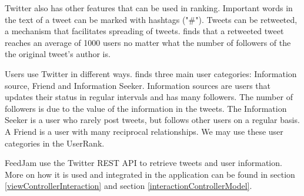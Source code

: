 
Twitter also has other features that can be used in ranking. Important words in the text of a tweet can be marked with hashtags ("\#"). Tweets can be retweeted, a mechanism that facilitates spreading of tweets. \citep{Kwak2010} finds that a retweeted tweet reaches an average of 1000 users no matter what the number of followers of the  the original tweet's author is.


Users use Twitter in different ways. \citet{Akshay2007} finds three main user categories: Information source, Friend and Information Seeker. Information sources are users that updates their status in regular intervals and has many followers. The number of followers is due to the value of the information in the tweets. The Information Seeker is a user who rarely post tweets, but follows other users on a regular basis. A Friend is a user with many reciprocal relationships. We may use these user categories in the UserRank.

FeedJam use the Twitter REST API to retrieve tweets and user information. More on how it is used and integrated in the application can be found in section \ref{viewControllerInteraction} and section \ref{interactionControllerModel}. 

